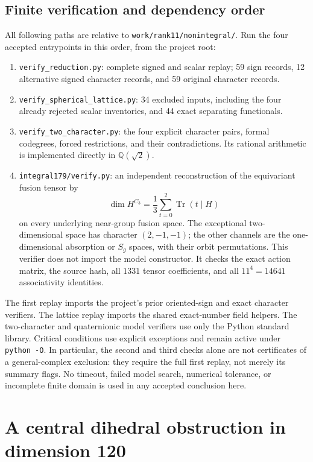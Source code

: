 \documentclass[11pt,a4paper]{article}
\begin{document}
\subsection{Finite verification and dependency order}
\label{subsec:r11-nonintegral-replay}

All following paths are relative to \texttt{work/rank11/nonintegral/}.
Run the four accepted entrypoints in this order, from the project root:
\begin{enumerate}
\item \nolinkurl{verify_reduction.py}: complete signed and scalar replay;
59 sign records, 12 alternative signed character records, and
59 original character records.
\item \nolinkurl{verify_spherical_lattice.py}: 34 excluded inputs,
including the four already rejected scalar inventories, and
44 exact separating functionals.
\item \nolinkurl{verify_two_character.py}: the four explicit character
pairs, formal codegrees, forced restrictions, and their contradictions.
Its rational arithmetic is implemented directly in $\mathbb Q(\sqrt2)$.
\item \nolinkurl{integral179/verify.py}: an independent reconstruction of
the equivariant fusion tensor by
\[
 \dim H^{C_3}=\frac13\sum_{t=0}^2\operatorname{Tr}(t\mid H)
\]
on every underlying near-group fusion space. The exceptional
two-dimensional space has character $(2,-1,-1)$; the other channels
are the one-dimensional absorption or $S_g$ spaces, with their orbit
permutations. This verifier does not import the model constructor.
It checks the exact action matrix, the source hash, all $1331$ tensor
coefficients, and all $11^4=14641$ associativity identities.
\end{enumerate}

The first replay imports the project's prior oriented-sign and exact
character verifiers. The lattice replay imports the shared exact-number
field helpers. The two-character and quaternionic model verifiers use
only the Python standard library. Critical conditions use explicit
exceptions and remain active under \texttt{python -O}. In particular,
the second and third checks alone are not certificates of a
general-complex exclusion: they require the full first replay, not merely
its summary flags. No timeout, failed model search, numerical tolerance,
or incomplete finite domain is used in any accepted conclusion here.

\section{A central dihedral obstruction in dimension 120}
\label{sec:rank11-d120}
\end{document}
